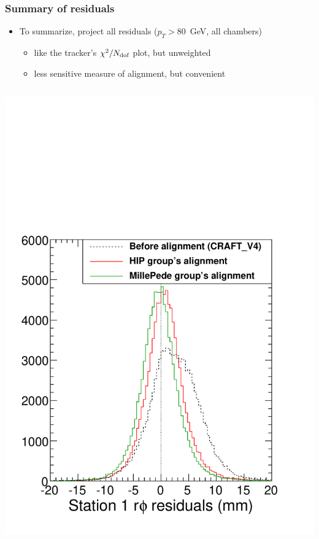 \documentclass[compress]{beamer}
\begin{document}
\begin{frame}
\frametitle{Summary of residuals}

\begin{itemize}
\item To summarize, project all residuals ($p_T > 80$~GeV, all chambers)
\begin{itemize}
\item like the tracker's $\chi^2/N_{\mbox{\scriptsize dof}}$ plot, but unweighted
\item less sensitive measure of alignment, but convenient
\end{itemize}
\end{itemize}

\begin{columns}
\includegraphics[width=\linewidth]{raw_station1.pdf}


\end{columns}
\end{frame}
\end{document}
